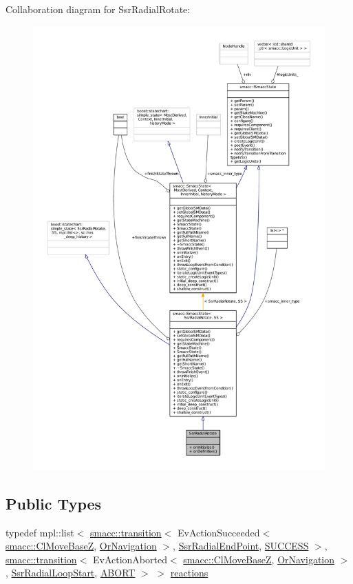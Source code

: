 Collaboration diagram for Ssr\+Radial\+Rotate\+:
\nopagebreak
\begin{figure}[H]
\begin{center}
\leavevmode
\includegraphics[width=350pt]{structSsrRadialRotate__coll__graph}
\end{center}
\end{figure}
\subsection*{Public Types}
\begin{DoxyCompactItemize}
\item 
typedef mpl\+::list$<$ \hyperlink{classsmacc_1_1transition}{smacc\+::transition}$<$ Ev\+Action\+Succeeded$<$ \hyperlink{classsmacc_1_1ClMoveBaseZ}{smacc\+::\+Cl\+Move\+BaseZ}, \hyperlink{classOrNavigation}{Or\+Navigation} $>$, \hyperlink{structSsrRadialEndPoint}{Ssr\+Radial\+End\+Point}, \hyperlink{classSUCCESS}{S\+U\+C\+C\+E\+SS} $>$, \hyperlink{classsmacc_1_1transition}{smacc\+::transition}$<$ Ev\+Action\+Aborted$<$ \hyperlink{classsmacc_1_1ClMoveBaseZ}{smacc\+::\+Cl\+Move\+BaseZ}, \hyperlink{classOrNavigation}{Or\+Navigation} $>$, \hyperlink{structSsrRadialLoopStart}{Ssr\+Radial\+Loop\+Start}, \hyperlink{classABORT}{A\+B\+O\+RT} $>$ $>$ \hyperlink{structSsrRadialRotate_a1bf5e4694b34ab75717c1eaa34de93e3}{reactions}
\end{DoxyCompactItemize}
